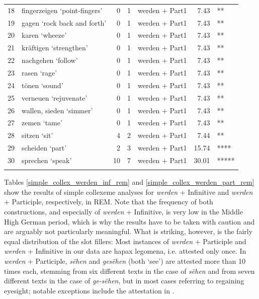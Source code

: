 \documentclass[output=paper,colorlinks,citecolor=brown]{langscibook}
\begin{document}
\begin{table}[ht]
\begin{tabular}{rlrrlrl}
  18 & fingerzeigen `point-fingers' &   0 &   1 & werden + Part1 & 7.43 & ** \\ 
  19 & gagen `rock back and forth' &   0 &   1 & werden + Part1 & 7.43 & ** \\ 
  20 & karen `wheeze' &   0 &   1 & werden + Part1 & 7.43 & ** \\ 
  21 & kräftigen `strengthen'&   0 &   1 & werden + Part1 & 7.43 & ** \\ 
  22 & nachgehen `follow'&   0 &   1 & werden + Part1 & 7.43 & ** \\ 
  23 & rasen `rage' &   0 &   1 & werden + Part1 & 7.43 & ** \\ 
  24 & tönen `sound'&   0 &   1 & werden + Part1 & 7.43 & ** \\ 
  25 & verneuen `rejuvenate'&   0 &   1 & werden + Part1 & 7.43 & ** \\ 
  26 & wallen, sieden `simmer'&   0 &   1 & werden + Part1 & 7.43 & ** \\ 
  27 & zemen `tame' &   0 &   1 & werden + Part1 & 7.43 & ** \\ 
  28 & sitzen `sit' &   4 &   2 & werden + Part1 & 7.44 & ** \\ 
  29 & scheiden `part' &   2 &   3 & werden + Part1 & 15.74 & **** \\ 
  30 & sprechen `speak'&  10 &   7 & werden + Part1 & 30.01 & ***** \\ 
   \lspbottomrule
\end{tabular}
\end{table}

Tables \ref{simple_collex_werden_inf_rem} and \ref{simple_collex_werden_part_rem}  show the results of simple collexeme analyses for \textit{werden} + Infinitive and \textit{werden} + Participle, respectively, in REM. Note that the frequency of both constructions, and especially of \textit{werden} + Infinitive, is very low in the Middle High German period, which is why the results have to be taken with caution and are arguably not particularly meaningful. What is striking, however, is the fairly equal distribution of the slot fillers: Most instances of \textit{werden} + Participle and \textit{werden} + Infinitive in our data are hapax legomena, i.e. attested only once. In \textit{werden} + Participle, \textit{sëhen} and \textit{gesëhen} (both `see') are attested more than 10 times each, stemming from six different texts in the case of \textit{sëhen} and from seven different texts in the case of \textit{ge-sëhen}, but in most cases referring to regaining eyesight; notable exceptions include the attestation in . 
\end{document}
